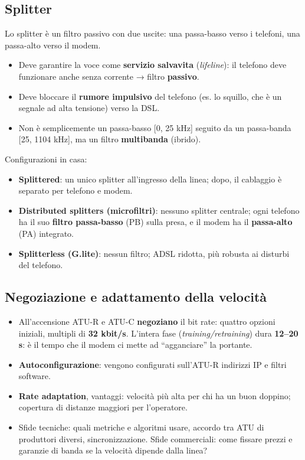 \subsection{Splitter}

\begin{inbreve}

Lo splitter è un filtro passivo con due uscite: una passa-basso verso i telefoni, una passa-alto verso il modem.

\end{inbreve}

\begin{itemize}
\tightlist
\item
  Deve garantire la voce come \textbf{servizio salvavita} (\emph{lifeline}): il telefono deve funzionare anche senza corrente → filtro \textbf{passivo}.
\item
  Deve bloccare il \textbf{rumore impulsivo} del telefono (es. lo squillo, che è un segnale ad alta tensione) verso la DSL.
\item
  Non è semplicemente un passa-basso {[}0, 25 kHz{]} seguito da un passa-banda {[}25, 1104 kHz{]}, ma un filtro \textbf{multibanda} (ibrido).
\end{itemize}

Configurazioni in casa:

\begin{itemize}
\tightlist
\item
  \textbf{Splittered}: un unico splitter all'ingresso della linea; dopo, il cablaggio è separato per telefono e modem.
\item
  \textbf{Distributed splitters (microfiltri)}: nessuno splitter centrale; ogni telefono ha il suo \textbf{filtro passa-basso} (PB) sulla presa, e il modem ha il \textbf{passa-alto} (PA) integrato.
\item
  \textbf{Splitterless (G.lite)}: nessun filtro; ADSL ridotta, più robusta ai disturbi del telefono.
\end{itemize}

\subsection{Negoziazione e adattamento della velocità}

\begin{itemize}
\tightlist
\item
  All'accensione ATU-R e ATU-C \textbf{negoziano} il bit rate: quattro opzioni iniziali, multipli di \textbf{32 kbit/s}. L'intera fase (\emph{training/retraining}) dura \textbf{12--20 s}: è il tempo che il modem ci mette ad ``agganciare'' la portante.
\item
  \textbf{Autoconfigurazione}: vengono configurati sull'ATU-R indirizzi IP e filtri software.
\item
  \textbf{Rate adaptation}, vantaggi: velocità più alta per chi ha un buon doppino; copertura di distanze maggiori per l'operatore.
\item
  Sfide tecniche: quali metriche e algoritmi usare, accordo tra ATU di produttori diversi, sincronizzazione. Sfide commerciali: come fissare prezzi e garanzie di banda se la velocità dipende dalla linea?
\end{itemize}

